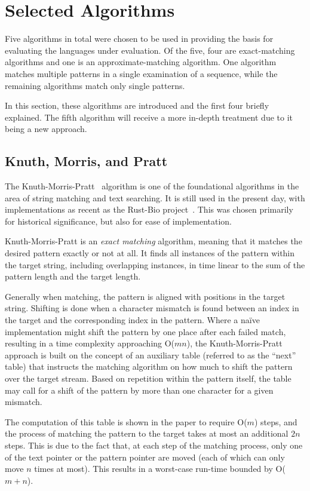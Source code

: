 \section{Selected Algorithms}
\label{sec:algorithms}

Five algorithms in total were chosen to be used in providing the basis for evaluating the languages under evaluation. Of the five, four are exact-matching algorithms and one is an approximate-matching algorithm. One algorithm matches multiple patterns in a single examination of a sequence, while the remaining algorithms match only single patterns.

In this section, these algorithms are introduced and the first four briefly explained. The fifth algorithm will receive a more in-depth treatment due to it being a new approach.

\subsection{Knuth, Morris, and Pratt}

The Knuth-Morris-Pratt~\cite{knuth.morris.pratt.1977} algorithm is one of the foundational algorithms in the area of string matching and text searching. It is still used in the present day, with implementations as recent as the Rust-Bio project~\cite{rust.bio.2015}. This was chosen primarily for historical significance, but also for ease of implementation.

Knuth-Morris-Pratt is an \textit{exact matching} algorithm, meaning that it matches the desired pattern exactly or not at all. It finds all instances of the pattern within the target string, including overlapping instances, in time linear to the sum of the pattern length and the target length.

Generally when matching, the pattern is aligned with positions in the target string. Shifting is done when a character mismatch is found between an index in the target and the corresponding index in the pattern. Where a na\"{i}ve implementation might shift the pattern by one place after each failed match, resulting in a time complexity approaching O($mn$), the Knuth-Morris-Pratt approach is built on the concept of an auxiliary table (referred to as the ``next'' table) that instructs the matching algorithm on how much to shift the pattern over the target stream. Based on repetition within the pattern itself, the table may call for a shift of the pattern by more than one character for a given mismatch.

The computation of this table is shown in the paper to require O($m$) steps, and the process of matching the pattern to the target takes at most an additional $2n$ steps. This is due to the fact that, at each step of the matching process, only one of the text pointer or the pattern pointer are moved (each of which can only move $n$ times at most). This results in a worst-case run-time bounded by O($m+n$).


